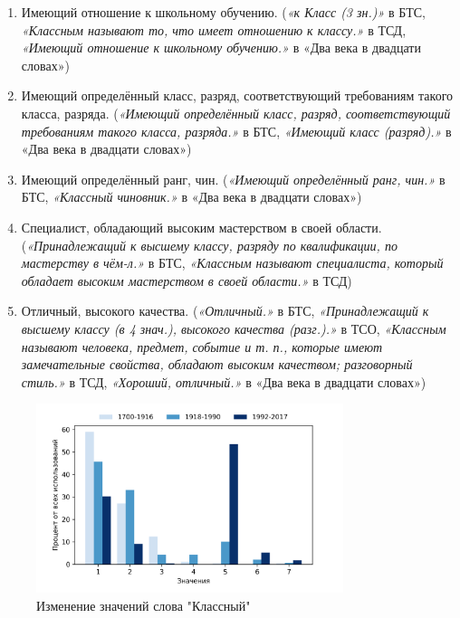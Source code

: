 \begin{enumerate}
    \item Имеющий отношение к школьному обучению.
(\textit{«к Класс (3 зн.)»} в БТС,
\textit{«Классным называют то, что имеет отношению к классу.»} в ТСД,
\textit{«Имеющий отношение к школьному обучению.»} в «Два века в двадцати словах»)

    \item Имеющий определённый класс, разряд, соответствующий требованиям такого класса, разряда.
(\textit{«Имеющий определённый класс, разряд, соответствующий требованиям такого класса, разряда.»} в БТС,
\textit{«Имеющий класс (разряд).»} в «Два века в двадцати словах»)

    \item Имеющий определённый ранг, чин.
(\textit{«Имеющий определённый ранг, чин.»} в БТС,
\textit{«Классный чиновник.»} в «Два века в двадцати словах»)

    \item Специалист, обладающий высоким мастерством в своей области.
(\textit{«Принадлежащий к высшему классу, разряду по квалификации, по мастерству в чём-л.»} в БТС,
\textit{«Классным называют специалиста, который обладает высоким мастерством в своей области.»} в ТСД)

    \item Отличный, высокого качества.
(\textit{«Отличный.»} в БТС,
\textit{«Принадлежащий к высшему классу (в 4 знач.), высокого качества (разг.).»} в ТСО,
\textit{«Классным называют человека, предмет, событие и т. п., которые имеют замечательные свойства,
обладают высоким качеством; разговорный стиль.»} в ТСД,
\textit{«Хороший, отличный.»} в «Два века в двадцати словах»)
\end{enumerate}

\begin{figure}[H]
	\centering
	\includegraphics[width=0.8\textwidth]{img/visualizations/klassnyj_minimal}
	\caption{Изменение значений слова "Классный"}
	\label{fig:Классный}
\end{figure}

